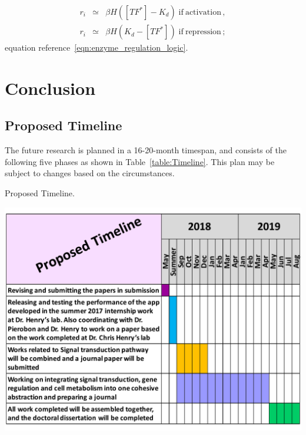 \documentclass[print,phd_com]{nuthesis}
\begin{document}
\begin{eqnarray} \label{eqn:enzyme_regulation_logic}
r_i &\simeq& \beta H \left( [TF^{*}] - K_d \right) \; \mathrm{if~activation} \, , \\
r_i &\simeq& \beta H \left( K_d - [TF^{*}] \right) \; \mathrm{if~repression} \, ; \nonumber
\end{eqnarray}
equation reference~\eqref{eqn:enzyme_regulation_logic}.


\chapter{Conclusion}
\label{sec:Conclusion}
\backmatter


\section{Proposed Timeline}
The future research is planned in a 16-20-month timespan, and consists of the following five phases as shown in Table~\ref{table:Timeline}. This plan may be subject to changes based on the circumstances. 
\begin{table} [H]
	\centering
	\caption{Proposed Timeline.}
	\vspace{-0.1in}
	\includegraphics[width=\linewidth]{Comprehensive_Timeline.pdf}
	\label{table:Timeline}
\end{table}



\end{document}
